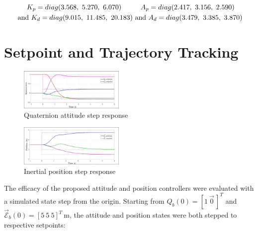 \documentclass[a4paper, 10pt, conference]{ieeeconf}
\begin{document}
\begin{subequations}
\vspace{-3pt}
\begin{multline}
K_p=diag(3.568,~5.270,~6.070)\\~\text{and}~K_d=diag(9.015,~11.485,~20.183)
\end{multline}
\vspace{-22pt}
\begin{multline}
A_p=diag(2.417,~3.156,~2.590)\\~\text{and}~A_d=diag(3.479,~3.385,~3.870)
\end{multline}
\end{subequations}
\section{Setpoint and Trajectory Tracking}
\label{sec:setpoint}
\begin{figure}[tbp]
\centering
\includegraphics[width=0.45\textwidth]{figs/attitude-step}
\vspace{-10pt}
\caption{Quaternion attitude step response}
\label{fig:attitude-step}
\end{figure}
\begin{figure}[tbp]
\vspace{-10pt}
\centering
\includegraphics[width=0.45\textwidth]{figs/position-step}
\vspace{-10pt}
\caption{Inertial position step response}
\label{fig:position-step}
\vspace{-20pt}
\end{figure}
\par
The efficacy of the proposed attitude and position controllers were evaluated with a simulated state step from the origin. Starting from $Q_b(0)=[1~\vec{0}\hspace{2pt}]^T$ and $\vec{\mathcal{E}}_b(0)=[5~5~5]^T~\text{m}$, the attitude and position states were both stepped to respective setpoints:
\end{document}
